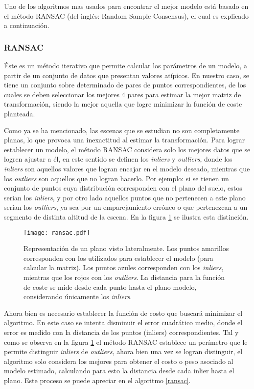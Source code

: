 Uno de los algoritmos mas usados para encontrar el mejor modelo está basado en el método RANSAC (del inglés: Random Sample Consensus), el cual es explicado a continuación.

\subsubsection*{RANSAC}

Éste es un método iterativo que permite calcular los parámetros de un modelo, a partir de un conjunto de datos que presentan valores atípicos. En nuestro caso, se tiene un conjunto sobre determinado de pares de puntos correspondientes, de los cuales se deben seleccionar los mejores 4 pares para estimar la mejor matriz de transformación, siendo la mejor aquella que logre minimizar la función de coste planteada.


Como ya se ha mencionado, las escenas que se estudian no son completamente planas, lo que provoca una inexactitud al estimar la transformación. Para lograr establecer un modelo, el método RANSAC considera solo los mejores datos que se logren ajustar a él, en este sentido se definen los \textit{inliers} y \textit{outliers}, donde los \textit{inliers} son aquellos valores que logran encajar en el modelo deseado, mientras que los \textit{outliers} son aquellos que no logran hacerlo. Por ejemplo: si se tienen un conjunto de puntos cuya distribución corresponden con el plano del suelo, estos serian los \textit{inliers}, y por otro lado aquellos puntos que no pertenecen a este plano serian los \textit{outliers}, ya sea por un emparejamiento erróneo o que pertenezcan a un segmento de distinta altitud de la escena. En la figura \ref{imagen:ransac} se ilustra esta distinción.

\begin{figure}[h]
	\centering
	\texttt{[image: ransac.pdf]}
	\caption[Mejor modelo - RANSAC]{Representación de un plano visto lateralmente. Los puntos amarillos corresponden con los utilizados para establecer el modelo (para calcular la matriz). Los puntos azules corresponden con los \textit{inliers}, mientras que los rojos con los \textit{outliers}. La distancia para la función de coste se mide desde cada punto hasta el plano modelo, considerando únicamente los \textit{inliers}.}
	\label{imagen:ransac}
\end{figure}

Ahora bien es necesario establecer la función de costo que buscará minimizar el algoritmo. En este caso se intenta disminuir el error cuadrático medio, donde el error es medido con la distancia de los puntos (inliers) correspondientes. Tal y como se observa en la figura \ref{imagen:ransac} el método RANSAC establece un perímetro que le permite distinguir \textit{inliers} de \textit{outliers}, ahora bien una vez se logran distinguir, el algoritmo solo considera los mejores para obtener el costo o peso asociado al modelo estimado, calculando para esto la distancia desde cada inlier hasta el plano. Este proceso se puede apreciar en el algoritmo \ref{ransac}.

